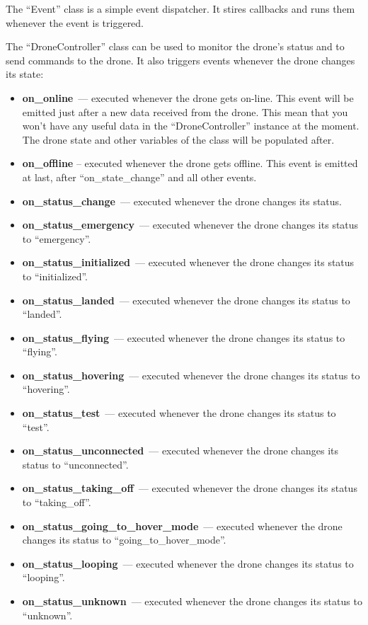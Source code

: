 \documentclass[12pt]{article}
\begin{document}
    The ``Event'' class is a simple event dispatcher. It stires callbacks
    and runs them whenever the event is triggered.

    The ``DroneController'' class can be used to monitor the drone's status and
    to send commands to the drone. It also triggers events whenever
    the drone changes its state:

    \begin{itemize}

        \item {\bf on\_online}~--- executed whenever the drone gets on-line.
          This event will be emitted just after a new data received
          from the drone. This mean that you won't have any
          useful data in the ``DroneController'' instance at the moment.
          The drone state and other variables of the class
          will be populated after.
        \item {\bf on\_offline} -- executed whenever the drone gets offline.
            This event is emitted at last, after ``on\_state\_change'' and all
            other events.

        \item {\bf on\_status\_change}~--- executed whenever the drone changes its status.

        \item {\bf on\_status\_emergency}~--- executed whenever the drone
          changes its status to ``emergency''.
        \item {\bf on\_status\_initialized}~--- executed whenever the drone
          changes its status to ``initialized''.
        \item {\bf on\_status\_landed}~--- executed whenever the drone
          changes its status to ``landed''.
        \item {\bf on\_status\_flying}~--- executed whenever the drone
          changes its status to ``flying''.
        \item {\bf on\_status\_hovering}~--- executed whenever the drone
          changes its status to ``hovering''.
        \item {\bf on\_status\_test}~--- executed whenever the drone
          changes its status to ``test''.
        \item {\bf on\_status\_unconnected}~--- executed whenever the drone
          changes its status to ``unconnected''.
        \item {\bf on\_status\_taking\_off}~--- executed whenever the drone
          changes its status to ``taking\_off''.
        \item {\bf on\_status\_going\_to\_hover\_mode}~--- executed whenever the drone
          changes its status to ``going\_to\_hover\_mode''.
        \item {\bf on\_status\_looping}~--- executed whenever the drone
          changes its status to ``looping''.
        \item {\bf on\_status\_unknown}~--- executed whenever the drone
          changes its status to ``unknown''.


\end{itemize}
\end{document}
